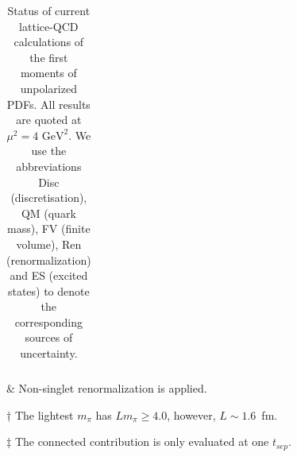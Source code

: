 \begin{table}[!t]
\begin{threeparttable}
\begin{tabular}{llcllccccccl}
\bottomrule
\end{tabular}
\begin{tablenotes}
\scriptsize
\item[$\&$] Non-singlet renormalization is applied.
\item[$\dagger$] The lightest $m_\pi$ has $Lm_\pi\ge 4.0$, however, 
$L\sim 1.6$~fm.
\item[$\ddag$] The connected contribution is only evaluated at one $t_{sep}$.
\end{tablenotes}
\end{threeparttable}
\caption{\small Status of current lattice-QCD calculations of the first 
moments of unpolarized PDFs.
%
All results are quoted at $\mu^2=4\mbox{ GeV}^2$.
%
We use the abbreviations Disc (discretisation), QM (quark mass),
FV (finite volume), Ren (renormalization) and ES (excited states)
to denote the corresponding sources of uncertainty.}
\label{tab:unpolLQCDstatus1B}
\end{table}

